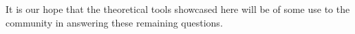 \documentclass[journal, twocolumn]{IEEEtran}
\begin{document}
It is our hope that the theoretical tools showcased here will be of some use to the community in answering these remaining questions.


\end{document}
